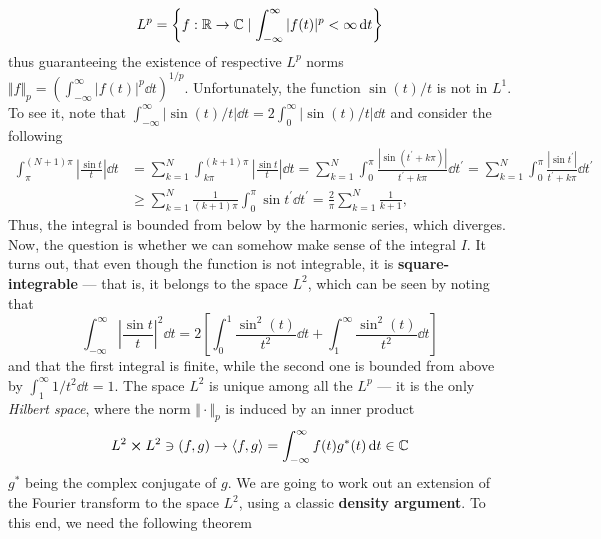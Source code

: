 \begin{equation}
    L^p = \left\{f:\mathbb{R} \to \mathbb{C} \mid \int_{-\infty}^{\infty} |f(t)|^p < \infty \dd{t}  \right\}
\end{equation}
thus guaranteeing the existence of respective \(L^p\) norms \(\Vert f \Vert_p = \left(\int_{-\infty}^{\infty}  |f(t)|^p \dd{t}  \right)^{1/p}\).
Unfortunately, the function \(\sin (t)/t\) is not in \(L^1\). To see it, note that
\(\int_{-\infty}^{\infty} \vert \sin (t)/t \vert \dd{t} = 2 \int_{0}^{\infty} \vert \sin (t)/t \vert \dd{t}  \)
and consider the following
\begin{align*}
    \int_{\pi}^{(N+1)\pi}\left|\frac{\sin t}{t}\right|\dd{t} & =\sum_{k=1}^N\int_{k\pi}^{(k+1)\pi}\left|\frac{\sin t}t\right|\dd{t}
    =\sum_{k=1}^N\int_0^{\pi}  \frac{|\sin(t^{\prime} +k\pi)|}{t^{\prime} +k\pi}\dd{t^{\prime} }
    =\sum_{k=1}^N\int_0^{\pi}\frac{|\sin t^{\prime} |}{t^{\prime} +k\pi}    \dd{t^{\prime} }                                                     \\\
                                                             & \geq \sum_{k=1}^N\frac 1{(k+1)\pi}\int_0^{\pi}  \sin t^{\prime}  \dd{t^{\prime} }
    =\frac 2{\pi}\sum_{k=1}^N\frac 1{k+1},
\end{align*}
Thus, the integral is bounded from below by the harmonic series, which diverges.
Now, the question is whether we can somehow make sense of the integral \(I\).
It turns out, that
even though the function is not integrable, it is \textbf{square-integrable} --- that is, it belongs to the
space \(L^2\), which can be seen by noting that
\begin{equation}
    \int_{-\infty }^{\infty}\left|\frac{\sin t}t\right|^2 \dd{t}  =
    2\left[ \int_{0}^{1}  \frac{\sin^2(t)}{t^2}\dd{t}  + \int_{1}^{\infty }  \frac{\sin^2(t)}{t^2}  \dd{t}  \right]
\end{equation}
and that the first integral is finite, while the second one is bounded from above by \(\int_{1}^{\infty} 1/t^2 \dd{t} = 1\).
The space \(L^2\) is unique among all the \(L^p\) --- it is the only \textit{Hilbert space},
where the norm \(\Vert \cdot \Vert_p \) is induced by an inner product
\begin{equation}
    L^2 \cross L^2 \ni (f,g) \to \langle f,g \rangle = \int_{-\infty}^{\infty} f(t)g^*(t) \dd{t} \in \mathbb{C}
\end{equation}
\(g^*\) being the complex conjugate of \(g\). We are going to work out an extension of the Fourier transform
to the space \(L^2\), using a classic \textbf{density argument}. To this end, we need the following theorem
